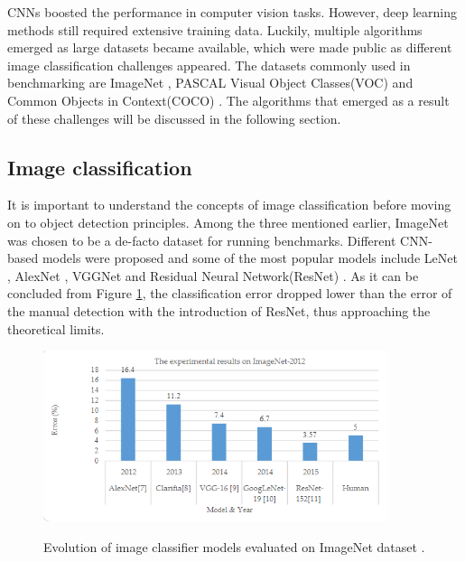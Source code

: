 \documentclass[english, 12pt, a4paper, elec, utf8, a-1b, online]{aaltothesis}
\begin{document}
CNNs boosted the performance in computer vision tasks. However, deep learning methods still required extensive training data. Luckily, multiple algorithms emerged as large datasets became available, which were made public as different image classification challenges appeared. The  datasets commonly used in benchmarking are ImageNet \cite{Russakovsky2014}, PASCAL Visual Object Classes(VOC) \cite{Everingham10} and Common Objects in Context(COCO) \cite{Lin2014}. The algorithms that emerged as a result of these challenges will be discussed in the following section. 

\subsection{Image classification}
\label{classification_section} 
It is important to understand the concepts of image classification before moving on to object detection principles. Among the three mentioned earlier, ImageNet was chosen to be a de-facto dataset for running benchmarks.  Different CNN-based models were proposed and some of the most popular models include LeNet \cite{lecun-gradientbased-learning-applied-1998}, AlexNet \cite{NIPS2012_c399862d}, VGGNet \cite{Simonyan2014} and Residual Neural Network(ResNet) \cite{He2015}. As it can be concluded from Figure \ref{image_net}, the classification error dropped lower than the error of the manual detection with the introduction of ResNet, thus approaching the theoretical limits. 

\begin{figure}[htb]
	\begin{center}
		\includegraphics[height=5cm]{./image_net.png}
	\end{center}
	\caption{Evolution of image classifier models evaluated on ImageNet dataset \cite{alom01}.}
	\begin{center}
		\label{image_net}
	\end{center}
\end{figure}
\FloatBarrier
\end{document}

